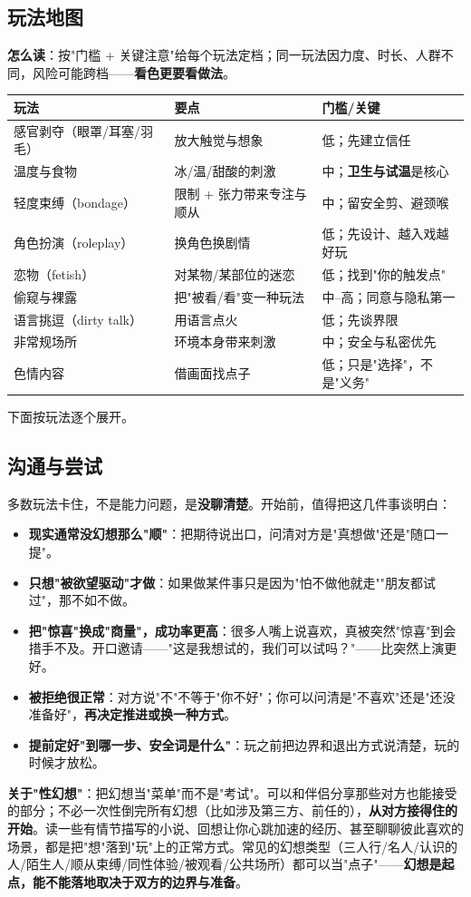 \documentclass[12pt,UTF8,openany]{ctexbook}
\begin{document}
\subsection*{玩法地图}
\textbf{怎么读}：按"门槛 + 关键注意"给每个玩法定档；同一玩法因力度、时长、人群不同，风险可能跨档——\textbf{看色更要看做法}。
\begin{tabularx}{\textwidth}{l X l}
\toprule
\textbf{玩法} & \textbf{要点} & \textbf{门槛/关键} \\
\midrule
感官剥夺（眼罩/耳塞/羽毛） & 放大触觉与想象 & 低；先建立信任 \\
温度与食物 & 冰/温/甜酸的刺激 & 中；\textbf{卫生与试温}是核心 \\
轻度束缚（bondage） & 限制 + 张力带来专注与顺从 & 中；留安全剪、避颈喉 \\
角色扮演（roleplay） & 换角色换剧情 & 低；先设计、越入戏越好玩 \\
恋物（fetish） & 对某物/某部位的迷恋 & 低；找到"你的触发点" \\
偷窥与裸露 & 把"被看/看"变一种玩法 & 中--高；同意与隐私第一 \\
语言挑逗（dirty talk） & 用语言点火 & 低；先谈界限 \\
非常规场所 & 环境本身带来刺激 & 中；安全与私密优先 \\
色情内容 & 借画面找点子 & 低；只是"选择"，不是"义务" \\
\bottomrule
\end{tabularx}
下面按玩法逐个展开。
\subsection*{沟通与尝试}
多数玩法卡住，不是能力问题，是\textbf{没聊清楚}。开始前，值得把这几件事谈明白：
\begin{itemize}[leftmargin=2em,itemsep=0.3em]
  \item \textbf{现实通常没幻想那么"顺"}：把期待说出口，问清对方是"真想做"还是"随口一提"。
  \item \textbf{只想"被欲望驱动"才做}：如果做某件事只是因为"怕不做他就走""朋友都试过"，那不如不做。
  \item \textbf{把"惊喜"换成"商量"，成功率更高}：很多人嘴上说喜欢，真被突然"惊喜"到会措手不及。开口邀请——"这是我想试的，我们可以试吗？"——比突然上演更好。
  \item \textbf{被拒绝很正常}：对方说"不"不等于"你不好"；你可以问清是"不喜欢"还是"还没准备好"，\textbf{再决定推进或换一种方式}。
  \item \textbf{提前定好"到哪一步、安全词是什么"}：玩之前把边界和退出方式说清楚，玩的时候才放松。
\end{itemize}
\textbf{关于"性幻想"}：把幻想当"菜单"而不是"考试"。可以和伴侣分享那些对方也能接受的部分；不必一次性倒完所有幻想（比如涉及第三方、前任的），\textbf{从对方接得住的开始}。读一些有情节描写的小说、回想让你心跳加速的经历、甚至聊聊彼此喜欢的场景，都是把"想"落到"玩"上的正常方式。常见的幻想类型（三人行/名人/认识的人/陌生人/顺从束缚/同性体验/被观看/公共场所）都可以当"点子"——\textbf{幻想是起点，能不能落地取决于双方的边界与准备}。
\end{document}
